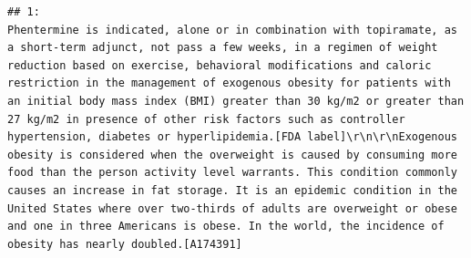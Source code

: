 \documentclass[
]{book}
\begin{document}
\begin{verbatim}
## 1:                                                                                                                                                                                                                                                                                                                                                                                                                                                                                                                                                                                                                                                                                                                                                                                                                                                                                                                                 Phentermine is indicated, alone or in combination with topiramate, as a short-term adjunct, not pass a few weeks, in a regimen of weight reduction based on exercise, behavioral modifications and caloric restriction in the management of exogenous obesity for patients with an initial body mass index (BMI) greater than 30 kg/m2 or greater than 27 kg/m2 in presence of other risk factors such as controller hypertension, diabetes or hyperlipidemia.[FDA label]\r\n\r\nExogenous obesity is considered when the overweight is caused by consuming more food than the person activity level warrants. This condition commonly causes an increase in fat storage. It is an epidemic condition in the United States where over two-thirds of adults are overweight or obese and one in three Americans is obese. In the world, the incidence of obesity has nearly doubled.[A174391]

\end{verbatim}
\end{document}
